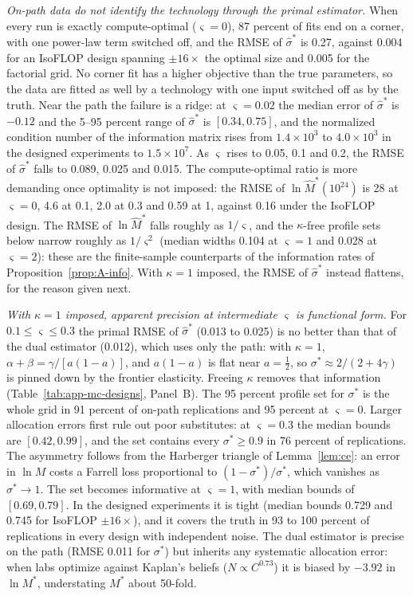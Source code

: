 \textit{On-path data do not identify the technology through the primal estimator.} When every run is exactly
compute-optimal ($\varsigma=0$), 87 percent of fits end on a corner, with one power-law term switched off, and the RMSE of
$\hat\sigma^*$ is 0.27, against 0.004 for an IsoFLOP design spanning $\pm16\times$ the optimal size and 0.005 for the
factorial grid. No corner fit has a higher objective than the true parameters, so the data are fitted as well by a
technology with one input switched off as by the truth. Near the path the failure is a ridge: at $\varsigma=0.02$ the
median error of $\hat\sigma^*$ is $-0.12$ and the 5--95 percent range of $\hat\sigma^*$ is $[0.34,0.75]$, and the normalized condition
number of the information matrix rises from $1.4\times10^{3}$ to $4.0\times10^{3}$ in the designed experiments to
$1.5\times10^{7}$. As
$\varsigma$ rises to 0.05, 0.1 and 0.2, the RMSE of $\hat\sigma^*$ falls to 0.089, 0.025 and 0.015. The compute-optimal
ratio is more demanding once optimality is not imposed: the RMSE of $\ln\hat M^*(10^{24})$ is 28 at $\varsigma=0$, 4.6 at
0.1, 2.0 at 0.3 and 0.59 at 1, against 0.16 under the IsoFLOP design. The RMSE of $\ln\hat M^*$ falls roughly as $1/\varsigma$, and the
$\kappa$-free profile sets below narrow roughly as $1/\varsigma^2$ (median widths 0.104 at $\varsigma=1$ and 0.028 at
$\varsigma=2$): these are the finite-sample counterparts of the information rates of Proposition~\ref{prop:A-info}. With
$\kappa=1$ imposed, the RMSE of $\hat\sigma^*$ instead flattens, for the reason given next.

\textit{With $\kappa=1$ imposed, apparent precision at intermediate $\varsigma$ is functional form.} For
$0.1\le\varsigma\le0.3$ the primal RMSE of $\hat\sigma^*$ (0.013 to 0.025) is no better than that of the dual estimator
(0.012), which uses only the path: with $\kappa=1$, $\alpha+\beta=\gamma/[a(1-a)]$, and $a(1-a)$ is flat near $a=\tfrac12$,
so $\sigma^*\approx2/(2+4\gamma)$ is pinned down by the frontier elasticity. Freeing $\kappa$ removes that information
(Table~\ref{tab:app-mc-designs}, Panel~B). The 95 percent profile set for $\sigma^*$ is the whole grid in 91 percent of
on-path replications and 95 percent at $\varsigma=0$. Larger allocation errors first rule out poor substitutes: at
$\varsigma=0.3$ the median bounds are $[0.42,0.99]$, and the set contains every $\sigma^*\ge0.9$ in 76 percent of
replications. The asymmetry follows from the Harberger triangle of Lemma~\ref{lem:ce}: an error in $\ln M$ costs a
Farrell loss proportional to $(1-\sigma^*)/\sigma^*$, which vanishes as $\sigma^*\to1$. The set becomes informative at
$\varsigma=1$, with median bounds of $[0.69,0.79]$. In the designed experiments it is tight (median bounds 0.729 and 0.745
for IsoFLOP $\pm16\times$), and it covers the truth in 93 to 100 percent of replications in every design with independent
noise. The dual estimator is precise on the path
(RMSE 0.011 for $\sigma^*$) but inherits any systematic allocation error: when labs optimize against Kaplan's beliefs
($N\propto C^{0.73}$) it is biased by $-3.92$ in $\ln M^*$, understating $M^*$ about 50-fold.

